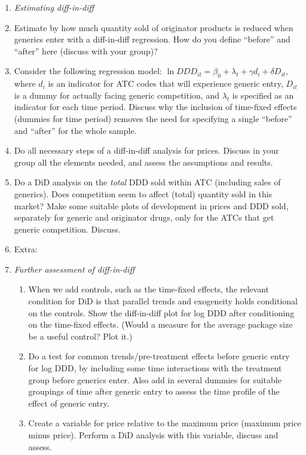 \documentclass[12pt,a4paper]{article}
\begin{document}
\begin{enumerate}
 \item[] \emph{Estimating diff-in-diff}
 \item Estimate by how much quantity sold of originator products is reduced when generics enter with a diff-in-diff regression. How do you define ``before'' and ``after'' here (discuss with your group)?
 \item Consider the following regression model: $\ln DDD_{it} = \beta_0 + \lambda_t + \gamma d_i + \delta D_{it}$, where $d_i$ is an indicator for ATC codes that will experience generic entry, $D_{it}$ is a dummy for actually facing generic competition, and $\lambda_t$ is specified as an indicator for each time period. Discuss why the inclusion of time-fixed effects (dummies for time period) removes the need for specifying a single ``before'' and ``after'' for the whole sample.
 \item Do all necessary steps of a diff-in-diff analysis for prices. Discuss in your group all the elements needed, and assess the assumptions and results.
 \item Do a DiD analysis on the \emph{total} DDD sold within ATC (including sales of generics). Does competition seem to affect (total) quantity sold in this market? Make some suitable plots of development in prices and DDD sold, separately for generic and originator drugs, only for the ATCs that get generic competition. Discuss.
 \item Extra:
 \item[] \emph{Further assessment of diff-in-diff}
  \begin{enumerate}
  \item When we add controls, such as the time-fixed effects, the relevant condition for DiD is that parallel trends and exogeneity holds conditional on the controls. Show the diff-in-diff plot for log DDD after conditioning on the time-fixed effects. (Would a measure for the average package size be a useful control? Plot it.)
  \item Do a test for common trends/pre-treatment effects before generic entry for log DDD, by including some time interactions with the treatment group before generics enter. Also add in several dummies for suitable groupings of time after generic entry to assess the time profile of the effect of generic entry.
  \item Create a variable for price relative to the maximum price (maximum price minus price). Perform a DiD analysis with this variable, discuss and assess.
  \end{enumerate}
\end{enumerate}
\end{document}
